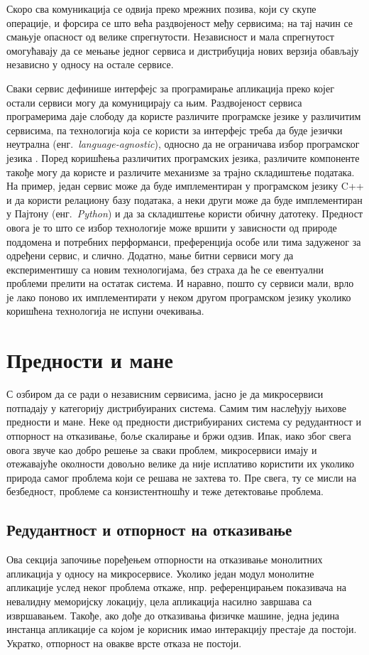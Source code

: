 \documentclass[12pt,oneside]{memoir}
\begin{document}
Скоро сва комуникација се одвија преко мрежних позива, који су скупе операције, и форсира се што већа раздвојеност међу сервисима; на тај начин се смањује опасност од велике спрегнутости. Независност и мала спрегнутост омогућавају да се мењање једног сервиса и дистрибуција нових верзија обављају независно у односу на остале сервисе.

Сваки сервис дефинише интерфејс за програмирање апликација преко којег остали сервиси могу да комуницирају са њим. Раздвојеност сервиса програмерима даје слободу да користе различите програмске језике у различитим сервисима, па технологија која се користи за интерфејс треба да буде језички неутрална (енг.~\textit{language-agnostic}), односно да не ограничава избор програмског језика \cite{BuildingMicroservices}. Поред коришћења различитих програмских језика, различите компоненте такође могу да користе и различите механизме за трајно складиштење података. На пример, један сервис може да буде имплементиран у програмском језику C++ и да користи релациону базу података, а неки други може да буде имплементиран у Пајтону (енг.~\textit{Python}) и да за складиштење користи обичну датотеку. Предност овога је то што се избор технологије може вршити у зависности од природе поддомена и потребних перформанси, преференција особе или тима задуженог за одређени сервис, и слично. Додатно, мање битни сервиси могу да експериментишу са новим технологијама, без страха да ће се евентуални проблеми прелити на остатак система. И наравно, пошто су сервиси мали, врло је лако поново их имплементирати у неком другом програмском језику уколико коришћена технологија не испуни очекивања.   

\section{Предности и мане}
С озбиром да се ради о независним сервисима, јасно је да микросервиси потпадају у категорију дистрибуираних система. Самим тим наслеђују њихове предности и мане. Неке од предности дистрибуираних система су редудантност и отпорност на отказивање, боље скалирање и бржи одзив. Ипак, иако због свега овога звуче као добро решење за сваки проблем, микросервиси имају и отежавајуће околности довољно велике да није исплативо користити их уколико природа самог проблема који се решава не захтева то. Пре свега, ту се мисли на безбедност, проблеме са конзистентношћу и теже детектовање проблема.

\subsection{Редудантност и отпорност на отказивање}
Ова секција започиње поређењем отпорности на отказивање монолитних апликација у односу на микросервисе. Уколико један модул монолитне апликације услед неког проблема откаже, нпр. референцирањем показивача на невалидну меморијску локацију, цела апликација насилно завршава са извршавањем. Такође, ако дође до отказивања физичке машине, једна једина инстанца апликације са којом је корисник имао интеракцију престаје да постоји. Укратко, отпорност на овакве врсте отказа не постоји.
\end{document}

